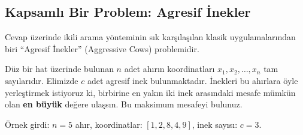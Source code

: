 \subsection{Kapsamlı Bir Problem: Agresif İnekler}

Cevap üzerinde ikili arama yönteminin sık karşılaşılan klasik uygulamalarından biri ``Agresif İnekler'' (Aggressive Cows) problemidir.

\begin{example}
Düz bir hat üzerinde bulunan $n$ adet ahırın koordinatları $x_1, x_2, \dots, x_n$ tam sayılarıdır. Elimizde $c$ adet agresif inek bulunmaktadır. İnekleri bu ahırlara öyle yerleştirmek istiyoruz ki, birbirine en yakın iki inek arasındaki mesafe mümkün olan \textbf{en büyük} değere ulaşsın. Bu maksimum mesafeyi bulunuz.

Örnek girdi: $n = 5$ ahır, koordinatlar: $[1, 2, 8, 4, 9]$, inek sayısı: $c = 3$.
\end{example}


